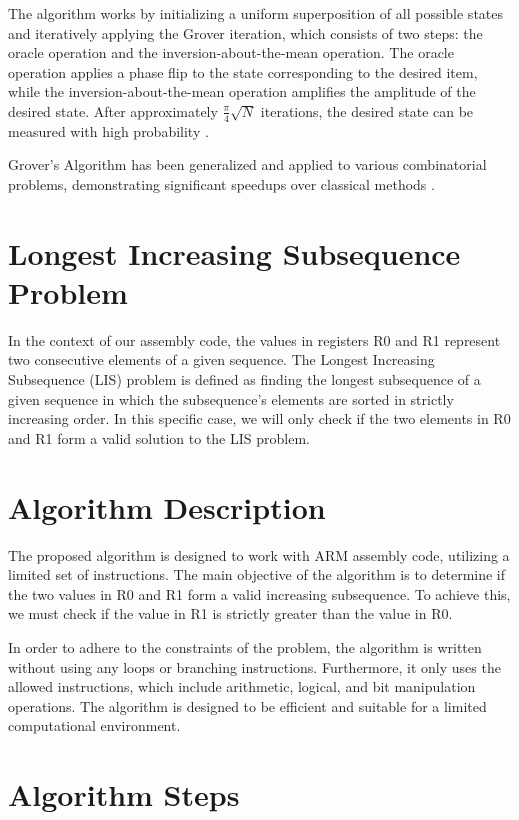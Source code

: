 The algorithm works by initializing a uniform superposition of all possible states and iteratively applying the Grover iteration, which consists of two steps: the oracle operation and the inversion-about-the-mean operation. The oracle operation applies a phase flip to the state corresponding to the desired item, while the inversion-about-the-mean operation amplifies the amplitude of the desired state. After approximately $\frac{\pi}{4}\sqrt{N}$ iterations, the desired state can be measured with high probability \cite{nielsen2010quantum}.

Grover's Algorithm has been generalized and applied to various combinatorial problems, demonstrating significant speedups over classical methods \cite{brassard1997exact,nielsen2010quantum}.


\section{Longest Increasing Subsequence Problem}

In the context of our assembly code, the values in registers R0 and R1 represent two consecutive elements of a given sequence. The Longest Increasing Subsequence (LIS) problem is defined as finding the longest subsequence of a given sequence in which the subsequence's elements are sorted in strictly increasing order. In this specific case, we will only check if the two elements in R0 and R1 form a valid solution to the LIS problem.

\section{Algorithm Description}

The proposed algorithm is designed to work with ARM assembly code, utilizing a limited set of instructions. The main objective of the algorithm is to determine if the two values in R0 and R1 form a valid increasing subsequence. To achieve this, we must check if the value in R1 is strictly greater than the value in R0.

In order to adhere to the constraints of the problem, the algorithm is written without using any loops or branching instructions. Furthermore, it only uses the allowed instructions, which include arithmetic, logical, and bit manipulation operations. The algorithm is designed to be efficient and suitable for a limited computational environment.

\section{Algorithm Steps}


